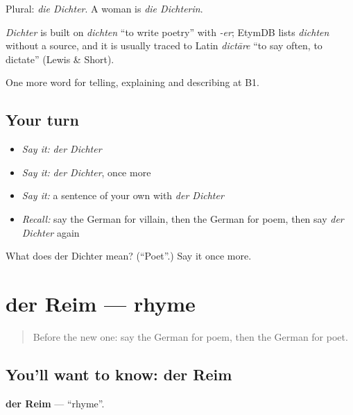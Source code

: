 Plural: \emph{die Dichter}. A woman is \emph{die Dichterin}.

\begin{cousinweb}
\emph{Dichter} is built on \emph{dichten} \textquotedblleft{}to write poetry\textquotedblright{} with \emph{-er}; EtymDB lists \emph{dichten} without a source, and it is usually traced to Latin \emph{dictāre} \textquotedblleft{}to say often, to dictate\textquotedblright{} (Lewis \& Short).
\end{cousinweb}

\begin{grammarlens}[title={What you've built}]
One more word for telling, explaining and describing at B1.
\end{grammarlens}

\subsection*{Your turn}
\begin{itemize}
\raggedright
  \item \emph{Say it:} \emph{der Dichter}
  \item \emph{Say it:} \emph{der Dichter}, once more
  \item \emph{Say it:} a sentence of your own with \emph{der Dichter}
  \item \emph{Recall:} say the German for villain, then the German for poem, then say \emph{der Dichter} again
\end{itemize}

\begin{tcolorbox}[breakable,colback=teal!4,colframe=teal!35!black,title={Before you move on}]
What does der Dichter mean? (\textquotedblleft{}Poet\textquotedblright{}.) Say it once more.
\end{tcolorbox}
\section[der Reim]{der Reim — rhyme}

\label{lesson:GE-C521-reim}



\begin{quote}
Before the new one: say the German for poem, then the German for poet.
\end{quote}

\subsection*{You'll want to know: der Reim}
\textbf{der Reim} — \textquotedblleft{}rhyme\textquotedblright{}.

